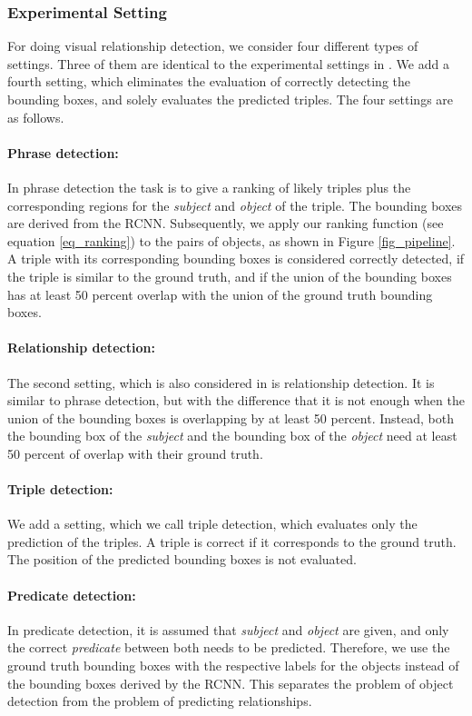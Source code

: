 \documentclass[runningheads,a4paper]{llncs}
\begin{document}
\subsubsection{Experimental Setting}

For doing visual relationship detection, we consider four different types of settings. Three of them are identical to the experimental settings in \cite{visual}. We add a fourth setting, which eliminates the evaluation of correctly detecting the bounding boxes, and solely evaluates the predicted triples. The four settings are as follows. 

\paragraph{Phrase detection:} In phrase detection the task is to give a ranking of likely triples plus the corresponding regions for the \textit{subject} and \textit{object} of the triple. The bounding boxes are derived from the RCNN. Subsequently, we apply our ranking function (see equation \ref{eq_ranking}) to the pairs of objects, as shown in Figure \ref{fig_pipeline}. A triple with its corresponding bounding boxes is considered correctly detected, if the triple is similar to the ground truth, and if the union of the bounding boxes has at least 50 percent overlap with the union of the ground truth bounding boxes.

\paragraph{Relationship detection:} The second setting, which is also considered in \cite{visual} is relationship detection. It is similar to phrase detection, but with the difference that it is not enough when the union of the bounding boxes is overlapping by at least 50 percent. Instead, both the bounding box of the \textit{subject} and the bounding box of the \textit{object} need at least 50 percent of overlap with their ground truth.

\paragraph{Triple detection:} We add a setting, which we call triple detection, which evaluates only the prediction of the triples. A triple is correct if it corresponds to the ground truth. The position of the predicted bounding boxes is not evaluated.

\paragraph{Predicate detection:} In predicate detection,  it is assumed that \textit{subject} and \textit{object} are given, and only the correct \textit{predicate} between both needs to be predicted. Therefore, we use the ground truth bounding boxes with the respective labels for the objects instead of the bounding boxes derived by the RCNN. This separates the problem of object detection from the problem of predicting relationships.\newline
\end{document}
